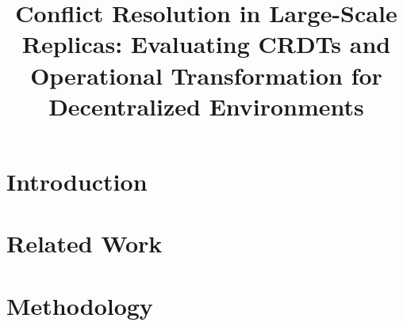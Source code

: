 \documentclass[conference]{IEEEtran}
\begin{document}
\title{Conflict Resolution in Large-Scale Replicas: Evaluating CRDTs and Operational Transformation for Decentralized Environments}

\author{
\and
{}
\and
{}
\and
{}
}

\maketitle

\begin{abstract}

\end{abstract}

\begin{IEEEkeywords}

\end{IEEEkeywords}

\section{Introduction}


\section{Related Work}\label{sec:related}


\section{Methodology}\label{sec:methodology}

\end{document}
